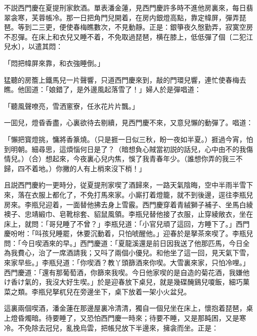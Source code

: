 不説西門慶在夏提刑家飲酒。單表潘金蓮，見西門慶許多時不進他房裏來，每日翡翠衾寒，芙蓉帳冷。那一日把角門兒開着，在房内銀燈高點，靠定幃屏，彈弄琵琶。等到二三更，便使春梅瞧數次，不見動靜。正是：銀箏夜久慇勤弄，寂寞空房不忍彈。在床上和衣兒又睡不着，不免取過琵琶，横在膝上，低低彈了個〔二犯江兒水〕，以遣其悶：

\begin{myquote}
「悶把幃屏來靠，和衣強睡倒。」
\end{myquote}

猛聽的房簷上鐵馬兒一片聲響，只道西門慶來到，敲的門環兒響，連忙使春梅去瞧。他囬道：「娘錯了，是外邊風起落雪了！」婦人於是彈唱道：

\begin{myquote}
「聽風聲嘹亮，雪洒窻寮，任氷花片片飄。」
\end{myquote}

一囬兒，燈昏香盡，心裏欲待去剔續，見西門慶不來，又意兒懶的動彈了。唱道：

\begin{myquote}
「懶把寳燈挑，慵將香篆燒。{\marktext\small\color{mydarkgray}（只是捱一日似三秋，盼一夜如半夏。）}捱過今宵，怕到明朝。細尋思，這煩惱何日是了？{\marktext\small\color{mydarkgray}（暗想負心賊當初説的話兒，心中由不的我傷情兒。）}{\marktext\small（合）}想起來，今夜裏心兒内焦，悞了我青春年少。{\marktext\small\color{mydarkgray}（誰想你弄的我三不歸，四不着地。）}你撇的人有上梢來沒下梢！」
\end{myquote}

且説西門慶約一更時分，従夏提刑家喫了酒歸來，一路天氣陰晦，空中半雨半雪下來，落在衣服上都化了，不免打馬來家。小廝打着燈籠，就不到後邊，逕往李瓶兒房來。李瓶兒迎着，一面替他拂去身上雪霰。西門慶穿着青絨獅子補子、坐馬白綾襖子、忠靖緞巾、皂靴棕套、貂鼠風領。李瓶兒替他接了衣服，止穿綾敞衣，坐在床上，就問：「哥兒睡了不曾？」李瓶兒道：「小官兒頑了這回，方睡下了。」西門慶吩咐：「呌孩兒睡罷，休要沉動着，只怕唬醒他。」迎春於是拏茶來喫了。李瓶兒問：「今日喫酒來的早。」西門慶道：「夏龍溪還是前日因我送了他那匹馬，今日全為我費心，治了一席酒請我；又呌了兩個小優兒。和他坐了這一回，見天氣下雪，來家早些。」李瓶兒道：「你喫酒？教丫頭篩酒來你喫。大雪裏來家，只怕冷哩。」西門慶道：「還有那葡萄酒，你篩來我喫。今日他家喫的是自造的菊花酒，我嫌他け香け氣的，我沒大好生喫。」於是迎春放下桌兒，就是幾碟醃鷄兒嗄飯，細巧菓菜之類。李瓶兒拏杌兒在旁邊坐下，桌下放着一架小火盆兒。

這裏兩個喫酒，潘金蓮在那邊屋裏冷清清，獨自一個兒坐在床上，懷抱着琵琶，桌上燈昏燭暗。待要睡了，又恐怕西門慶一時來；待要不睡，又是那盹困，又是寒冷。不免除去冠兒，亂挽烏雲，把帳兒放下半邊來，擁衾而坐。正是：

